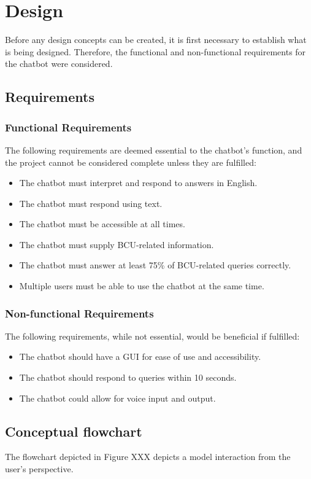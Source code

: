 \section{Design}
Before any design concepts can be created, it is first necessary to establish what is being designed. Therefore, the functional and 
non-functional requirements for the chatbot were considered.

\subsection{Requirements}
\subsubsection{Functional Requirements}
The following requirements are deemed essential to the chatbot's function, and the project cannot be considered complete unless they 
are fulfilled:

\begin{itemize}
    \item The chatbot must interpret and respond to answers in English.
    \item The chatbot must respond using text.
    \item The chatbot must be accessible at all times.
    \item The chatbot must supply BCU-related information.
    \item The chatbot must answer at least 75\% of BCU-related queries correctly.
    \item Multiple users must be able to use the chatbot at the same time.
\end{itemize}

\subsubsection{Non-functional Requirements}
The following requirements, while not essential, would be beneficial if fulfilled:

\begin{itemize}
    \item The chatbot should have a GUI for ease of use and accessibility.
    \item The chatbot should respond to queries within 10 seconds.
    \item The chatbot could allow for voice input and output.
\end{itemize}


\subsection{Conceptual flowchart}
The flowchart depicted in Figure XXX depicts a model interaction from the user's perspective.

